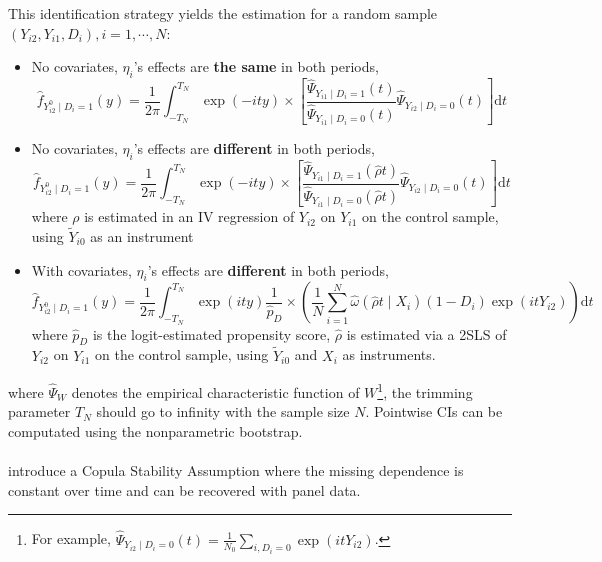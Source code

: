 \documentclass[twoside]{article}
\begin{document}
This identification strategy yields the estimation for a random sample $\left(Y_{i2},Y_{i1},D_i\right),i=1,\cdots,N$:
\begin{itemize}
    \item No covariates, $\eta_i$'s effects are \textbf{the same} in both periods, $$ \hat{f}_{Y^0_{i2}\mid D_i=1}(y) = \frac{1}{2\pi} \int^{T_N}_{-T_N} \exp\left(-ity\right) \times \left[ \frac{\hat{\Psi}_{Y_{i1}\mid D_i=1}(t)}{\hat{\Psi}_{Y_{i1}\mid D_i=0}(t)}\hat{\Psi}_{Y_{i2}\mid D_i=0}(t) \right] \mathrm{d}t $$
    \item No covariates, $\eta_i$'s effects are \textbf{different} in both periods, $$ \hat{f}_{Y^0_{i2}\mid D_i=1}(y) = \frac{1}{2\pi} \int^{T_N}_{-T_N} \exp\left(-ity\right) \times \left[ \frac{\hat{\Psi}_{Y_{i1}\mid D_i=1}(\hat{\rho}t)}{\hat{\Psi}_{Y_{i1}\mid D_i=0}(\hat{\rho}t)}\hat{\Psi}_{Y_{i2}\mid D_i=0}(t) \right] \mathrm{d}t $$
    where $\rho$ is estimated in an IV regression of $Y_{i2}$ on $Y_{i1}$ on the control sample, using $\tilde{Y}_{i0}$ as an instrument
    \item With covariates, $\eta_i$'s effects are \textbf{different} in both periods, $$ \hat{f}_{Y^0_{i2}\mid D_i=1}(y) = \frac{1}{2\pi} \int^{T_N}_{-T_N}\exp \left(ity\right) \frac{1}{\hat{p}_D}\times \left( \frac{1}{N} \sum^N_{i=1}\hat{\omega}\left(\hat{\rho}t\mid X_i\right)\left(1-D_i\right)\exp\left(itY_{i2}\right) \right) \mathrm{d}t$$
    where $\hat{p}_D$ is the logit-estimated propensity score, $\hat{\rho}$ is estimated via a 2SLS of $Y_{i2}$ on $Y_{i1}$ on the control sample, using $\tilde{Y}_{i0}$ and $X_i$ as instruments. 
\end{itemize}
where $\hat{\Psi}_W$ denotes the empirical characteristic function of $W$\footnote{For example, $\hat{\Psi}_{Y_{i2}\mid D_i=0}(t) = \frac{1}{N_0}\sum_{i,D_i=0}\exp(itY_{i2})$.}, the trimming parameter $T_N$ should go to infinity with the sample size $N$. Pointwise CIs can be computated using the nonparametric bootstrap.

\paragraph*{\citet{callaway2018quantile,callaway2019quantile}} introduce a Copula Stability Assumption where the missing dependence is constant over time and can be recovered with panel data.
\end{document}
